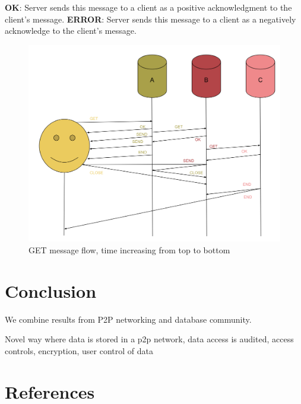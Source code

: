 \documentclass[preprint,10pt]{elsarticle}
\newcommand{\fscale}[1]{#1\linewidth}
\theoremstyle{definition}
\begin{document}
\textbf{OK}: Server sends this message to a client as a positive acknowledgment to the client's message.
\newline
\newline
\textbf{ERROR}: Server sends this message to a client as a negatively acknowledge to the client's message.
\begin{figure}[h!] \centering
	\includegraphics[width=\fscale{1}]{mx.png}
	\caption{GET message flow, time increasing from top to bottom}
	\label{fig:mx}
\end{figure}

\section{Conclusion}
We combine results from P2P networking and database community.

Novel way where data is stored in a p2p network, data access is audited, access controls, encryption, user control of data

\section{References}



\end{document}
